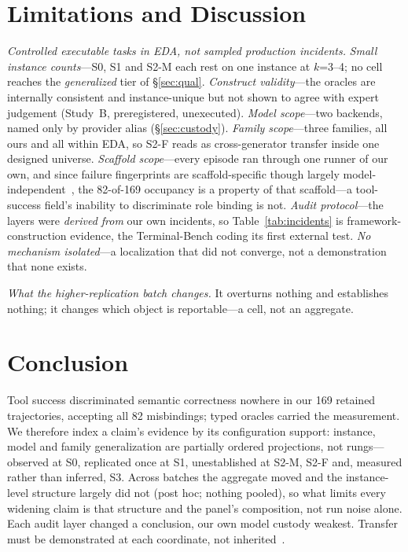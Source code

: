\documentclass{article}
\begin{document}
\section{Limitations and Discussion}
\label{sec:falsif}
\emph{Controlled executable tasks in EDA, not sampled production incidents.} \emph{Small instance counts}---S0, S1 and S2-M each rest on one instance at $k$=3--4; no cell reaches the \emph{generalized} tier of \S\ref{sec:qual}. \emph{Construct validity}---the oracles are internally consistent and instance-unique but not shown to agree with expert judgement (Study~B, preregistered, unexecuted). \emph{Model scope}---two backends, named only by provider alias (\S\ref{sec:custody}). \emph{Family scope}---three families, all ours and all within EDA, so S2-F reads as cross-generator transfer inside one designed universe. \emph{Scaffold scope}---every episode ran through one runner of our own, and since failure fingerprints are scaffold-specific though largely model-independent~\citep{scaffoldeffect}, the 82-of-169 occupancy is a property of that scaffold---a tool-success field's inability to discriminate role binding is not. \emph{Audit protocol}---the layers were \emph{derived from} our own incidents, so Table~\ref{tab:incidents} is framework-construction evidence, the Terminal-Bench coding its first external test. \emph{No mechanism isolated}---a localization that did not converge, not a demonstration that none exists.

\emph{What the higher-replication batch changes.} It overturns nothing and establishes nothing; it changes which object is reportable---a cell, not an aggregate.


\section{Conclusion}
Tool success discriminated semantic correctness nowhere in our 169 retained trajectories, accepting all 82 misbindings; typed oracles carried the measurement. We therefore index a claim's evidence by its configuration support: instance, model and family generalization are partially ordered projections, not rungs---observed at S0, replicated once at S1, unestablished at S2-M, S2-F and, measured rather than inferred, S3. Across batches the aggregate moved and the instance-level structure largely did not (post hoc; nothing pooled), so what limits every widening claim is that structure and the panel's composition, not run noise alone. Each audit layer changed a conclusion, our own model custody weakest. Transfer must be demonstrated at each coordinate, not inherited~\citep{longhorizon}.
\end{document}
